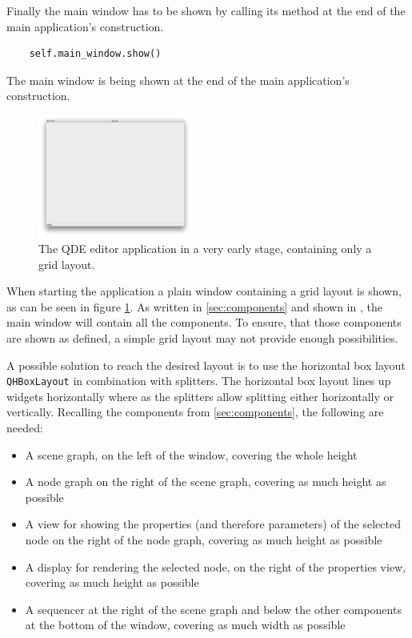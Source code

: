 \documentclass[10pt, openright, notitlepage]{scrreprt}
\newcommand{\myverb}{\collectverb{\fcolorbox{black!50}{black!25}}}
\begin{document}
Finally the main window has to be shown by calling its \myverb{show} method
at the end of the main application's construction.

\begin{listing}[H]
\begin{verbatim}
    self.main_window.show()
\end{verbatim}
\caption{\label{app-application-constructor}
The main window is being shown at the end of the main application's construction.}
\end{listing}

\begin{figure}[H]
\centering
\includegraphics[width=2in]{./images/qde_alpha_01.png}
\caption{\label{fig:editor-alpha-01}
The QDE editor application in a very early stage, containing only a grid layout.}
\end{figure}

When starting the application a plain window containing a grid layout is shown,
as can be seen in figure \ref{fig:editor-alpha-01}. As written in \ref{sec:components} and
shown in \citep[p. 29 ff.]{osterwalder_qde_2016}, the main window will contain all
the components. To ensure, that those components are shown as defined, a simple
grid layout may not provide enough possibilities.

A possible solution to reach the desired layout is to use the horizontal box
layout \texttt{QHBoxLayout} in combination with splitters. The horizontal box layout
lines up widgets horizontally where as the splitters allow splitting either
horizontally or vertically. Recalling the components from \ref{sec:components}, the following are needed:

\begin{itemize}
\item A scene graph, on the left of the window, covering the whole height
\item A node graph on the right of the scene graph, covering as much height as
possible
\item A view for showing the properties (and therefore parameters) of the selected
node on the right of the node graph, covering as much height as possible
\item A display for rendering the selected node, on the right of the properties
view, covering as much height as possible
\item A sequencer at the right of the scene graph and below the other components at
the bottom of the window, covering as much width as possible
\end{itemize}
\end{document}
